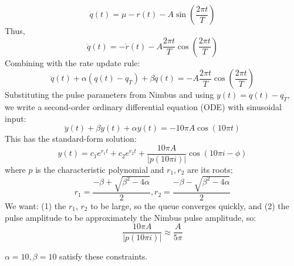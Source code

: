 \begin{appendix}
\begin{equation} 
    \dot{q}(t) = \mu - r(t) - A \sin(\frac{2\pi{}t}{T})
\end{equation}
%
\noindent Thus, 
%
\begin{equation}
    \ddot{q}(t) = - \dot{r}(t) - A \frac{2\pi{}t}{T} \cos(\frac{2\pi{}t}{T})
\end{equation}
%
\noindent Combining with the rate update rule:
%
\begin{equation}
    \ddot{q}(t) + \alpha (q(t) - q_T) + \beta \dot{q}(t) = - A \frac{2\pi{}t}{T} \cos(\frac{2\pi{}t}{T})
\end{equation}
%
\noindent Substituting the pulse parameters from Nimbus and using $y(t) = q(t) - q_T$, we write a second-order ordinary differential equation (ODE) with sinusoidal input:
%
\begin{equation}
    \ddot{y}(t) + \beta \dot{y}(t) + \alpha y(t) = - 10\pi{}A \cos(10\pi{}t)
\end{equation}
%
\noindent This has the standard-form solution:
%
\begin{equation}
    y(t) = c_1 e^{r_1 t} + c_2 e^{r_2 t} + \frac{10\pi{}A}{|p(10\pi{}i)|} \cos(10\pi{}i - \phi)
\end{equation}
%        
where $p$ is the characteristic polynomial and $r_1, r_2$ are its roots;
\ie 
\begin{equation}
r_1 = \frac{-\beta + \sqrt{\beta^2 - 4\alpha}}{2}, r_2 = \frac{-\beta - \sqrt{\beta^2 - 4\alpha}}{2}
\end{equation}
%
\noindent We want: (1) the $r_1$, $r_2$ to be large, so the queue converges quickly, and (2) the pulse amplitude to be approximately the Nimbus pulse amplitude, so:
%
\begin{equation}
\frac{10\pi{}A}{|p(10\pi{}i)|} \approx \frac{A}{5\pi}
\end{equation}

$\alpha = 10, \beta = 10$ satisfy these constraints.
\end{appendix}
